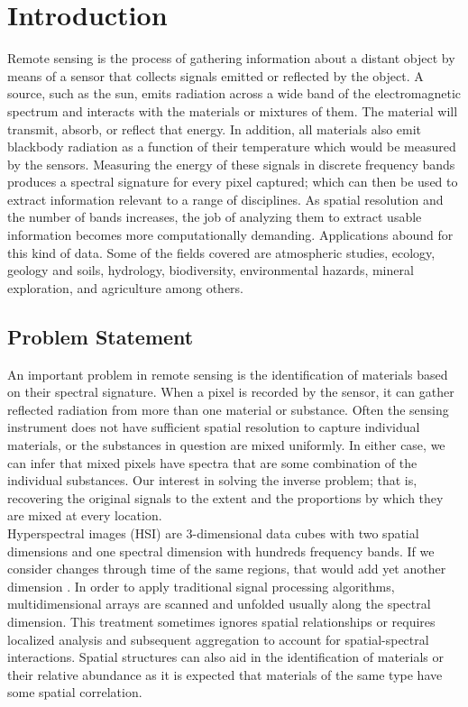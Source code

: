 \chapter{Introduction}  %
Remote sensing is the process of gathering information about a distant object by means of a sensor that collects signals emitted or reflected by the object.  A source, such as the sun, emits radiation across a wide band of the electromagnetic spectrum and interacts with the materials or mixtures of them.  The material will transmit, absorb, or reflect that energy.  In addition, all materials also emit blackbody radiation as a function of their temperature which would be measured by the sensors.  Measuring the energy of these signals in discrete frequency bands produces a spectral signature for every pixel captured; which can then be used to extract information relevant to a range of disciplines.  As spatial resolution and the number of bands increases, the job of analyzing them to extract usable information becomes more computationally demanding.  Applications abound for this kind of data.  Some of the fields covered are atmospheric studies, ecology, geology and soils, hydrology, biodiversity, environmental hazards, mineral exploration, and agriculture among others. 
\section{Problem Statement}
An important problem in remote sensing is the identification of materials based on their spectral signature.  When a pixel is recorded by the sensor, it can gather reflected radiation from more than one material or substance.  Often the sensing instrument does not have sufficient spatial resolution to capture individual materials, or the substances in question are mixed uniformly.  In either case, we can infer that mixed pixels have spectra that are some combination of the individual substances.  Our interest in solving the inverse problem; that is, recovering the original signals to the extent and the proportions by which they are mixed at every location.\\
Hyperspectral images (HSI) are 3-dimensional data cubes with two spatial dimensions and one spectral dimension with hundreds frequency bands.  If we consider changes through time of the same regions, that would add yet another dimension \cite{goenaga_unmixing_2013} \cite{reyes_change_2017}.  In order to apply traditional signal processing algorithms, multidimensional arrays are scanned and unfolded usually along the spectral dimension.  This treatment sometimes ignores spatial relationships or requires localized analysis and subsequent aggregation to account for spatial-spectral interactions.  Spatial structures can also aid in the identification of materials or their relative abundance as it is expected that materials of the same type have some spatial correlation.

